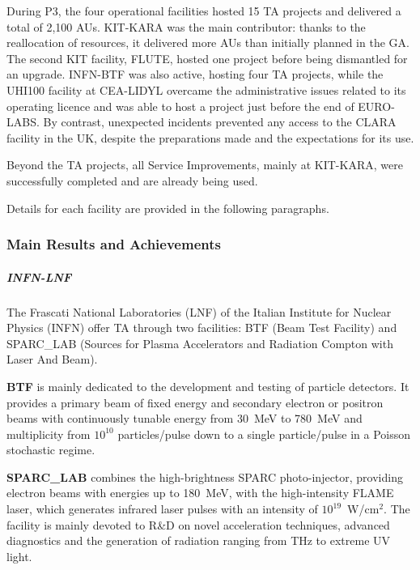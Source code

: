 During P3, the four operational facilities hosted 15 TA projects and delivered a total of 2,100 AUs. KIT-KARA was the main contributor: thanks to the reallocation of resources, it delivered more AUs than initially planned in the GA. The second KIT facility, FLUTE, hosted one project before being dismantled for an upgrade. INFN-BTF was also active, hosting four TA projects, while the UHI100 facility at CEA-LIDYL overcame the administrative issues related to its operating licence and was able to host a project just before the end of EURO-LABS. By contrast, unexpected incidents prevented any access to the CLARA facility in the UK, despite the preparations made and the expectations for its use. 

Beyond the TA projects, all Service Improvements, mainly at KIT-KARA, were successfully completed and are already being used.

Details for each facility are provided in the following paragraphs.

\subsubsection*{Main Results and Achievements}


\subparagraph{INFN-LNF} \mbox{}

The Frascati National Laboratories (LNF) of the Italian Institute for Nuclear Physics (INFN) offer TA through two facilities: BTF (Beam Test Facility) and SPARC\_LAB (Sources for Plasma Accelerators and Radiation Compton with Laser And Beam).

\textbf{BTF} is mainly dedicated to the development and testing of particle detectors. It provides a primary beam of fixed energy and secondary electron or positron beams with continuously tunable energy from \SI{30}{\MeV} to \SI{780}{\MeV} and multiplicity from $10^{10}$ particles/pulse down to a single particle/pulse in a Poisson stochastic regime.

\textbf{SPARC\_LAB} combines the high-brightness SPARC photo-injector, providing electron beams with energies up to \SI{180}{\MeV}, with the high-intensity FLAME laser, which generates infrared laser pulses with an intensity of $10^{19}$~W/cm$^2$. The facility is mainly devoted to R\&D on novel acceleration techniques, advanced diagnostics and the generation of radiation ranging from THz to extreme UV light.

